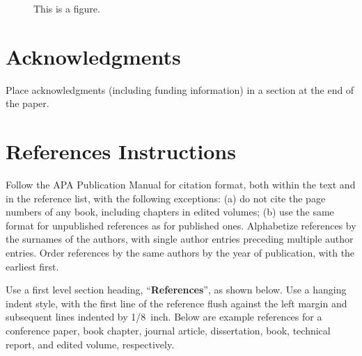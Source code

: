 \documentclass[10pt,letterpaper]{article}
\begin{document}
\begin{figure}[ht]
\begin{center}
\end{center}
\caption{This is a figure.} 
\label{sample-figure}
\end{figure}


\section{Acknowledgments}

Place acknowledgments (including funding information) in a section at
the end of the paper.


\section{References Instructions}

Follow the APA Publication Manual for citation format, both within the
text and in the reference list, with the following exceptions: (a) do
not cite the page numbers of any book, including chapters in edited
volumes; (b) use the same format for unpublished references as for
published ones. Alphabetize references by the surnames of the authors,
with single author entries preceding multiple author entries. Order
references by the same authors by the year of publication, with the
earliest first.

Use a first level section heading, ``{\bf References}'', as shown
below. Use a hanging indent style, with the first line of the
reference flush against the left margin and subsequent lines indented
by 1/8~inch. Below are example references for a conference paper, book
chapter, journal article, dissertation, book, technical report, and
edited volume, respectively.

\nocite{ChalnickBillman1988a}
\nocite{Feigenbaum1963a}
\nocite{Hill1983a}
\nocite{OhlssonLangley1985a}
\nocite{Matlock2001}
\nocite{NewellSimon1972a}
\nocite{ShragerLangley1990a}




\setlength{\bibleftmargin}{.125in}
\setlength{\bibindent}{-\bibleftmargin}


\end{document}
